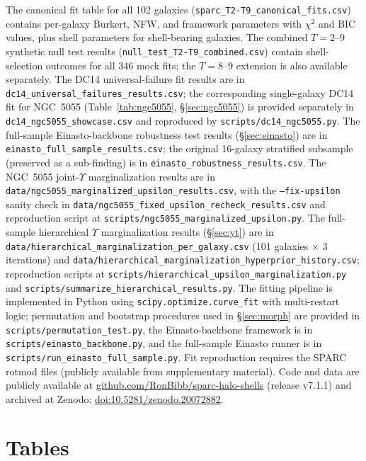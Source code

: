 \documentclass[linenumbers]{aastex701}
\newcommand{\Yt}{\Upsilon}
\begin{document}
The canonical fit table for all 102 galaxies (\texttt{sparc\_T2-T9\_canonical\_fits.csv}) contains per-galaxy Burkert, NFW, and framework parameters with $\chi^2$ and BIC values, plus shell parameters for shell-bearing galaxies. The combined $T=2$--$9$ synthetic null test results (\texttt{null\_test\_T2-T9\_combined.csv}) contain shell-selection outcomes for all 346 mock fits; the $T=8$--$9$ extension is also available separately. The DC14 universal-failure fit results are in \texttt{dc14\_universal\_failures\_results.csv}; the corresponding single-galaxy DC14 fit for NGC~5055 (Table~\ref{tab:ngc5055}, \S\ref{sec:ngc5055}) is provided separately in \texttt{dc14\_ngc5055\_showcase.csv} and reproduced by \texttt{scripts/dc14\_ngc5055.py}. The full-sample Einasto-backbone robustness test results (\S\ref{sec:einasto}) are in \texttt{einasto\_full\_sample\_results.csv}; the original 16-galaxy stratified subsample (preserved as a sub-finding) is in \texttt{einasto\_robustness\_results.csv}. The NGC~5055 joint-$\Yt$ marginalization results are in \texttt{data/ngc5055\_marginalized\_upsilon\_results.csv}, with the \texttt{--fix-upsilon} sanity check in \texttt{data/ngc5055\_fixed\_upsilon\_recheck\_results.csv} and reproduction script at \texttt{scripts/ngc5055\_marginalized\_upsilon.py}. The full-sample hierarchical $\Yt$ marginalization results (\S\ref{sec:yt}) are in \texttt{data/hierarchical\_marginalization\_per\_galaxy.csv} (101 galaxies $\times$ 3 iterations) and \texttt{data/hierarchical\_marginalization\_hyperprior\_history.csv}; reproduction scripts at \texttt{scripts/hierarchical\_upsilon\_marginalization.py} and \texttt{scripts/summarize\_hierarchical\_results.py}. The fitting pipeline is implemented in Python using \texttt{scipy.optimize.curve\_fit} with multi-restart logic; permutation and bootstrap procedures used in \S\ref{sec:morph} are provided in \texttt{scripts/permutation\_test.py}, the Einasto-backbone framework is in \texttt{scripts/einasto\_backbone.py}, and the full-sample Einasto runner is in \texttt{scripts/run\_einasto\_full\_sample.py}. Fit reproduction requires the SPARC rotmod files (publicly available from \citealt{Lelli2016} supplementary material). Code and data are publicly available at \href{https://github.com/RonBibb/sparc-halo-shells}{github.com/RonBibb/sparc-halo-shells} (release v7.1.1) and archived at Zenodo: \href{https://doi.org/10.5281/zenodo.20072882}{doi:10.5281/zenodo.20072882}.


\clearpage
{}
\section*{Tables}
\end{document}
